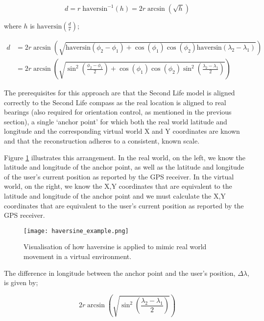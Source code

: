 \begin{equation}
	\label{haversine3}
	d = r\;\text{haversin}^{-1}\left( h \right) = 2r \arcsin \left( \sqrt{h} \right)
\end{equation}

where $h$ is $\text{haversin}\left( \frac{d}{r} \right)$;

\begin{align}
d & = 2r \arcsin\left( \sqrt{\text{haversin} \left( \phi_{2} - \phi_{1} \right) + \cos \left( \phi_{1} \right) \cos  \left( \phi_{2} \right) \text{haversin} \left( \lambda_{2} - \lambda_{1} \right) } \right) \nonumber \\ 
& = 2r \arcsin\left( \sqrt{\sin^{2} \left( \frac{\phi_{2} - \phi_{1}}{2}\right) + \cos\left( \phi_{1} \right) \cos\left( \phi_{2} \right) \sin^{2} \left( \frac{\lambda_{2} - \lambda_{1}}{2} \right) } \right)
\end{align}

The prerequisites for this approach are that the Second Life model is aligned correctly to the Second Life compass as the real location is aligned to real bearings (also required for orientation control, as mentioned in the previous section), a single `anchor point' for which both the real world latitude and longitude and the corresponding virtual world X and Y coordinates are known and that the reconstruction adheres to a consistent, known scale.

Figure \ref{haversine_example.png} illustrates this arrangement. In the real world, on the left, we know the latitude and longitude of the anchor point, as well as the latitude and longitude of the user's current position as reported by the GPS receiver. In the virtual world, on the right, we know the X,Y coordinates that are equivalent to the latitude and longitude of the anchor point and we must calculate the X,Y coordinates that are equivalent to the user's current position as reported by the GPS receiver.

\begin{figure}[h]
\centering
  \texttt{[image: haversine\_example.png]}
  \caption{Visualisation of how haversine is applied to mimic real world movement in a virtual environment.}
  \label{haversine_example.png}
\end{figure}

The difference in longitude between the anchor point and the user's position, $\Delta\lambda$, is given by;

\begin{equation}
2r \arcsin\left( \sqrt{\sin^{2} \left( \frac{\lambda_{2} - \lambda_{1}}{2} \right) } \right)
\end{equation}

